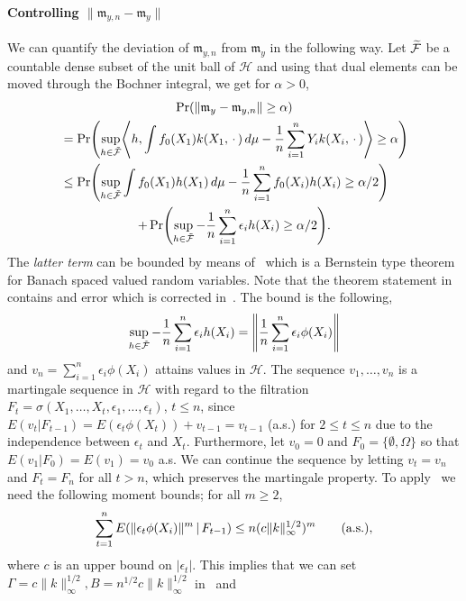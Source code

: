 \documentclass[10pt]{amsart}
\theoremstyle{definition}\newtheorem{defi}[theo]{Definition}\newtheorem{rema}[theo]{Remark}\newtheorem{exam}[theo]{Example}\newtheorem{exem}[theo]{Example}\newtheorem{nota}[theo]{Notation}
\theoremstyle{remark}
\newcommand{\cH}{\mathcal{H}}
\newcommand{\clF}{\mathcal{F}}
\newcommand{\mean}{\mathfrak{m}}
\let\oldtilde\tilde
\renewcommand*{\tilde}[1]{\mathchoice{\widetilde{#1}}{\widetilde{#1}}{\oldtilde{#1}}{\oldtilde{#1}}}
\let\originalleft\left
\let\originalright\right
\renewcommand{\left}{\mathopen{}\mathclose\bgroup\originalleft}
\renewcommand{\right}{\aftergroup\egroup\originalright}
\begin{document}
\paragraph{Controlling $\|\mean_{y,n} - \mean_y\|$} We can quantify the deviation of $\mean_{y,n}$ from $\mean_y$ in the following way. Let $\tilde{\clF}$ be a countable dense subset of the unit ball of $\cH$ and using that dual elements can be moved through the Bochner integral, we get for $\alpha>0$,
\begin{multline}\label{eq:mean_y_n_vs_y}
\Pr(\| \mean_y - \mean_{y,n}\| \geq \alpha)  \\
\begin{aligned}
&= \Pr\left(\sup_{h \in \tilde{\clF}} \left\langle h, \int f_0(X_1) k(X_1,\,\cdot\,) \, d\mu - \frac{1}{n} \sum_{i=1}^n Y_i k(X_i,\,\cdot\,) \right\rangle \geq \alpha \right)  \\
&\leq \Pr\left(\sup_{h \in \tilde{\clF}} \int f_0(X_1) h(X_1) \, d\mu - \frac{1}{n} \sum_{i=1}^n f_0(X_i) h(X_i) \geq \alpha/2\right) 
\end{aligned}\\
+ \Pr\left(\sup_{h \in \tilde{\clF}} - \frac{1}{n} \sum_{i=1}^n \epsilon_i h(X_i) \geq \alpha/2 \right).
\end{multline}
The \emph{latter term} can be bounded by means of~\cite[Theorem~3.3]{PIN94} which is a Bernstein type theorem for Banach spaced valued random variables. Note that the theorem statement in~\cite{PIN94} contains and error which is corrected in~\cite{PIN99}. The bound is the following,
\[
\sup_{h \in \tilde{\clF}} - \frac{1}{n} \sum_{i=1}^n \epsilon_i h(X_i) =
\left\|\frac{1}{n} \sum_{i=1}^n \epsilon_i \phi(X_i)\right\|
\]
and $v_n = \sum_{i=1}^n \epsilon_i \phi(X_i)$ attains values in $\cH$. The sequence $v_1,\dots, v_n$ is a martingale sequence in $\cH$ with regard to the filtration $F_t = \sigma(X_1,\dots,X_t,\epsilon_1,\dots, \epsilon_t)$, $t \leq n$, since $E(v_t |F_{t-1}) = E(\epsilon_t \phi(X_t)) + v_{t-1} = v_{t-1}$ (a.s.) for $2\leq t\leq n$ due to the independence between $\epsilon_t$ and $X_t$. Furthermore, let $v_0 = 0$ and $F_0 = \{\emptyset,\Omega\}$ so that $E(v_1 | F_0) = E(v_1) = v_0$ a.s. We can continue the sequence by letting $v_t = v_n$ and $F_t = F_n$ for all $t> n$, which preserves the martingale property. To apply~\cite[Theorem~3.3]{PIN94,PIN99} we need the following moment bounds; for all $m\geq 2$,
\[
\sum_{t=1}^n E\left(\|\epsilon_t \phi(X_i) \|^m \,\middle|\,F_{t-1}\right) \leq n (c \|k\|^{1/2}_\infty)^m \text{\quad\quad(a.s.)},
\]
where $c$ is an upper bound on $|\epsilon_t|$. This implies that we can set $\Gamma =c \|k\|^{1/2}_\infty, B= n^{1/2} c \|k\|^{1/2}_\infty$ in~\cite[Theorem~3.3]{PIN94,PIN99} and
\end{document}
